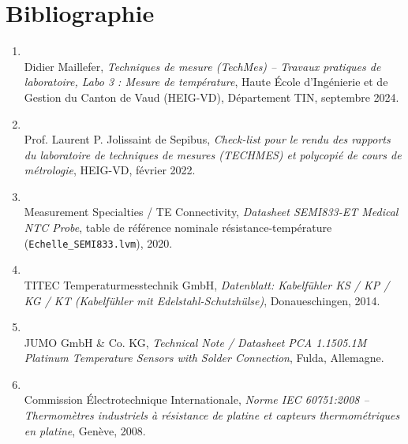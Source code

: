 \chapter{Bibliographie}
\label{sec:bibliographie}

\begin{enumerate}[leftmargin=1.2cm,label=\arabic*)]
    \item {} \\
    Didier Maillefer, \textit{Techniques de mesure (TechMes) -- Travaux pratiques de laboratoire, Labo 3 : Mesure de température}, Haute École d'Ingénierie et de Gestion du Canton de Vaud (HEIG-VD), Département TIN, septembre 2024.

    \item {} \\
    Prof. Laurent P. Jolissaint de Sepibus, \textit{Check-list pour le rendu des rapports du laboratoire de techniques de mesures (TECHMES) et polycopié de cours de métrologie}, HEIG-VD, février 2022.

    \item {} \\
    Measurement Specialties / TE Connectivity, \textit{Datasheet SEMI833-ET Medical NTC Probe}, table de référence nominale résistance-température (\texttt{Echelle\_SEMI833.lvm}), 2020.

    \item {} \\
    TITEC Temperaturmesstechnik GmbH, \textit{Datenblatt: Kabelfühler KS / KP / KG / KT (Kabelfühler mit Edelstahl-Schutzhülse)}, Donaueschingen, 2014.

    \item {} \\
    JUMO GmbH \& Co. KG, \textit{Technical Note / Datasheet PCA 1.1505.1M Platinum Temperature Sensors with Solder Connection}, Fulda, Allemagne.

    \item {} \\
    Commission Électrotechnique Internationale, \textit{Norme IEC 60751:2008 -- Thermomètres industriels à résistance de platine et capteurs thermométriques en platine}, Genève, 2008.
\end{enumerate}

